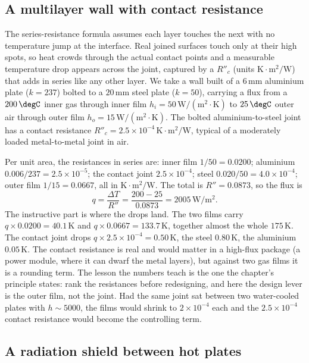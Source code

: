 \subsection{A multilayer wall with contact resistance}

The series-resistance formula assumes each layer touches the next with
no temperature jump at the interface. Real joined surfaces touch only at
their high spots, so heat crowds through the actual contact points and a
measurable temperature drop appears across the joint, captured by a
 $R''_c$ (units
$\si{\kelvin}\cdot\text{m}^2/\text{W}$) that adds in series like any
other layer. We take a wall built of a $6\,\si{\milli\meter}$ aluminium
plate ($k = 237$) bolted to a $20\,\si{\milli\meter}$ steel plate ($k =
50$), carrying a flux from a $200\,\degC$ inner gas through inner film
$h_i = 50\,\text{W}/(\text{m}^2\cdot\si{\kelvin})$ to $25\,\degC$ outer
air through outer film $h_o = 15\,\text{W}/(\text{m}^2\cdot\si{\kelvin})$.
The bolted aluminium-to-steel joint has a contact resistance $R''_c =
2.5 \times 10^{-4}\,\si{\kelvin}\cdot\text{m}^2/\text{W}$, typical of a
moderately loaded metal-to-metal joint in air.

Per unit area, the resistances in series are: inner film $1/50 = 0.0200$;
aluminium $0.006/237 = 2.5 \times 10^{-5}$; the contact joint $2.5
\times 10^{-4}$; steel $0.020/50 = 4.0 \times 10^{-4}$; outer film
$1/15 = 0.0667$, all in $\si{\kelvin}\cdot\text{m}^2/\text{W}$. The
total is $R'' = 0.0873$, so the flux is
\[
q = \frac{\Delta T}{R''} = \frac{200 - 25}{0.0873} = 2005\,\text{W}/
\text{m}^2.
\]
The instructive part is where the drops land. The two films carry
$q \times 0.0200 = 40.1\,\si{\kelvin}$ and $q \times 0.0667 =
133.7\,\si{\kelvin}$, together almost the whole $175\,\si{\kelvin}$. The
contact joint drops $q \times 2.5 \times 10^{-4} = 0.50\,\si{\kelvin}$,
the steel $0.80\,\si{\kelvin}$, the aluminium $0.05\,\si{\kelvin}$. The
contact resistance is real and would matter in a high-flux package
(a power module, where it can dwarf the metal layers), but against two
gas films it is a rounding term. The lesson the numbers teach is the one
the chapter's principle states: rank the resistances before redesigning,
and here the design lever is the outer film, not the joint. Had the same
joint sat between two water-cooled plates with $h \sim 5000$, the films
would shrink to $2 \times 10^{-4}$ each and the $2.5 \times 10^{-4}$
contact resistance would become the controlling term.

\subsection{A radiation shield between hot plates}


